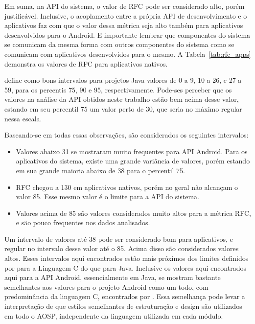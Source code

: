 Em suma, na API do sistema, o valor de RFC pode ser considerado alto, porém justificável. Inclusive, o acoplamento entre a própria API de desenvolvimento e o aplicativos faz com que o valor dessa métrica seja alto também para aplicativos desenvolvidos para o Android. E importante lembrar que componentes do sistema se comunicam da mesma forma com outros componentes do sistema como se comunicam com aplicativos desenvolvidos para o mesmo. A Tabela~\ref{tab:rfc_apps} demonstra os valores de RFC para aplicativos nativos.

 define como bons intervalos para projetos Java valores de 0 a 9, 10 a 26, e 27 a 59, para os percentis 75, 90 e 95, respectivamente. Pode-ses perceber que os valores na análise da API obtidos neste trabalho estão bem acima desse valor, estando em seu percentil 75 um valor perto de 30, que seria no máximo regular nessa escala.

Baseando-se em todas essas observações, são considerados os seguintes intervalos:

\begin{itemize}
\item Valores abaixo 31 se mostraram muito frequentes para API Android. Para os aplicativos do sistema, existe uma grande variância de valores, porém estando em sua grande maioria abaixo de 38 para o percentil 75.
\item RFC chegou a 130 em aplicativos nativos, porém no geral não alcançam o valor 85. Esse mesmo valor é o limite para a API do sistema.
\item Valores acima de 85 são valores considerados muito altos para a métrica RFC, e são pouco frequentes nos dados analisados.
\end{itemize}

Um intervalo de valores até 38 pode ser considerado bom para aplicativos, e regular no intervalo desse valor até o 85. Acima disso são considerados valores altos. Esses intervalos aqui encontrados estão mais próximos dos limites definidos por  para a Linguagem C do que para Java. Inclusive os valores aqui encontrados aqui para a API Android, essencialmente em Java, se mostram bastante semelhantes aos valores para o projeto Android como um todo, com predominância da linguagem C, encontrados por . Essa semelhança pode levar a interpretação de que estilos semelhantes de estruturação e design são utilizados em todo o AOSP, independente da linguagem utilizada em cada módulo.


